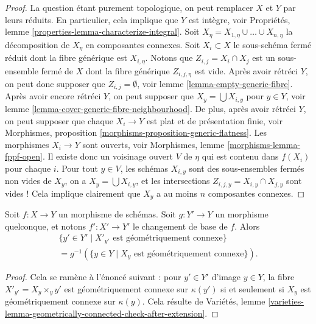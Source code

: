 \begin{proof}
La question étant purement topologique, on peut remplacer $X$ et $Y$ par
leurs réduits. En particulier, cela implique que $Y$ est intègre, voir
Propriétés, lemme \ref{properties-lemma-characterize-integral}.
Soit $X_\eta = X_{1, \eta} \cup \ldots \cup X_{n, \eta}$
la décomposition de $X_\eta$ en composantes connexes.
Soit $X_i \subset X$ le sous-schéma fermé réduit dont la fibre
générique est $X_{i, \eta}$. Notons que $Z_{i, j} = X_i \cap X_j$
est un sous-ensemble fermé de $X$ dont la fibre générique $Z_{i, j, \eta}$ est vide.
Après avoir rétréci $Y$, on peut donc supposer que $Z_{i, j} = \emptyset$, voir
lemme \ref{lemma-empty-generic-fibre}.
Après avoir encore rétréci $Y$, on peut supposer que
$X_y = \bigcup X_{i, y}$ pour $y \in Y$, voir
lemme \ref{lemma-cover-generic-fibre-neighbourhood}.
De plus, après avoir rétréci $Y$, on peut supposer que chaque $X_i \to Y$
est plat et de présentation finie, voir
Morphismes, proposition \ref{morphisms-proposition-generic-flatness}.
Les morphismes $X_i \to Y$ sont ouverts, voir
Morphismes, lemme \ref{morphisms-lemma-fppf-open}.
Il existe donc un voisinage ouvert $V$ de $\eta$ qui est contenu
dans $f(X_i)$ pour chaque $i$.
Pour tout $y \in V$, les schémas $X_{i, y}$ sont des
sous-ensembles fermés non vides de $X_y$, on a $X_y = \bigcup X_{i, y}$,
et les intersections $Z_{i, j, y} = X_{i, y} \cap X_{j, y}$
sont vides ! Cela implique clairement que
$X_y$ a au moins $n$ composantes connexes.
\end{proof}

\begin{lemma}
\label{lemma-base-change-fibres-geometrically-connected}
Soit $f : X \to Y$ un morphisme de schémas.
Soit $g : Y' \to Y$ un morphisme quelconque, et notons
$f' : X' \to Y'$ le changement de base de $f$.
Alors
\begin{align*}
\{y' \in Y' \mid X'_{y'}\text{ est géométriquement connexe}\} \\
= g^{-1}(\{y \in Y \mid X_y\text{ est géométriquement connexe}\}).
\end{align*}
\end{lemma}

\begin{proof}
Cela se ramène à l'énoncé suivant : pour $y' \in Y'$ d'image
$y \in Y$, la fibre $X'_{y'} = X_y \times_y y'$ est géométriquement
connexe sur $\kappa(y')$ si et seulement si $X_y$ est géométriquement connexe
sur $\kappa(y)$. Cela résulte de
Variétés,
lemme \ref{varieties-lemma-geometrically-connected-check-after-extension}.
\end{proof}

